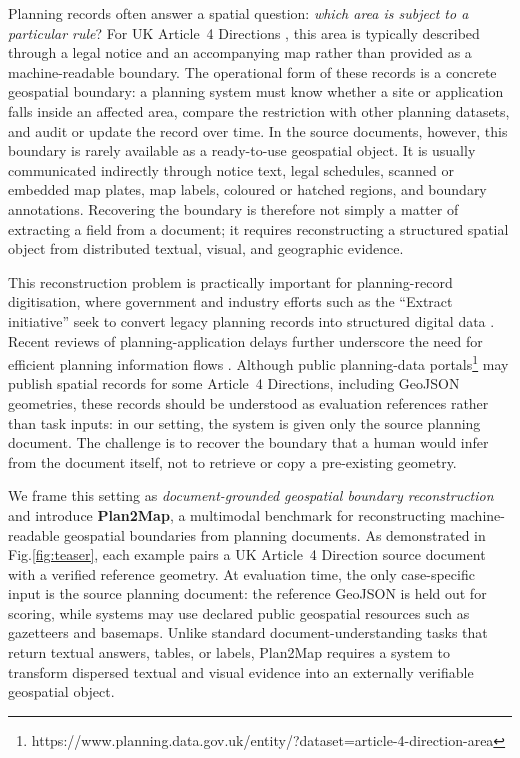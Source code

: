 \documentclass[11pt]{article}
\begin{document}
Planning records often answer a spatial question: \emph{which area is subject to a particular rule}? For UK Article~4 Directions \citep{planningdata2026article4direction}, this area is typically described through a legal notice and an accompanying map rather than provided as a machine-readable boundary. The operational form of these records is a concrete geospatial boundary: a planning system must know whether a site or application falls inside an affected area, compare the restriction with other planning datasets, and audit or update the record over time. In the source documents, however, this boundary is rarely available as a ready-to-use geospatial object. It is usually communicated indirectly through notice text, legal schedules, scanned or embedded map plates, map labels, coloured or hatched regions, and boundary annotations. Recovering the boundary is therefore not simply a matter of extracting a field from a document; it requires reconstructing a structured spatial object from distributed textual, visual, and geographic evidence.


This reconstruction problem is practically important for planning-record digitisation, where government and industry efforts such as the ``Extract initiative'' seek to convert legacy planning records into structured digital data \citep{govuk2025extract,colebourn2025extract}. Recent reviews of planning-application delays further underscore the need for efficient planning information flows \citep{weinstein2024UKgov,mhclg2026planningdelays}. Although public planning-data portals\footnote{https://www.planning.data.gov.uk/entity/?dataset=article-4-direction-area} may publish spatial records for some Article~4 Directions, including GeoJSON geometries, these records should be understood as evaluation references rather than task inputs: in our setting, the system is given only the source planning document. The challenge is to recover the boundary that a human would infer from the document itself, not to retrieve or copy a pre-existing geometry.




We frame this setting as \emph{document-grounded geospatial boundary reconstruction} and introduce \textbf{Plan2Map}, a multimodal benchmark for reconstructing machine-readable geospatial boundaries from planning documents. As demonstrated in Fig.\ref{fig:teaser}, each example pairs a UK Article~4 Direction source document with a verified reference geometry. At evaluation time, the only case-specific input is the source planning document: the reference GeoJSON is held out for scoring, while systems may use declared public geospatial resources such as gazetteers and basemaps. Unlike standard document-understanding tasks that return textual answers, tables, or labels, Plan2Map requires a system to transform dispersed textual and visual evidence into an externally verifiable geospatial object.
\end{document}
